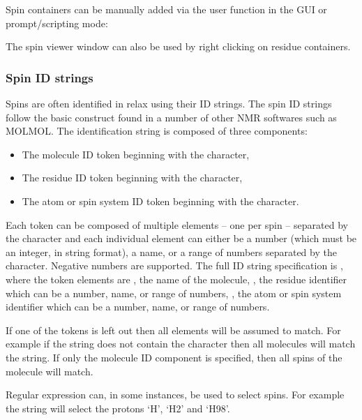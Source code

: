 Spin containers can be manually added via the  user function in the GUI or prompt/scripting mode:


The spin viewer window can also be used by right clicking on residue containers.



\subsubsection{Spin ID strings} \label{sect: spin ID}

Spins are often identified in relax using their ID strings.  The spin ID strings follow the basic construct found in a number of other NMR softwares such as MOLMOL.  The identification string is composed of three components:

\begin{itemize}
\item The molecule ID token beginning with the \promptstring{\#} character,
\item The residue ID token beginning with the \promptstring{:} character,
\item The atom or spin system ID token beginning with the  character.
\end{itemize}

Each token can be composed of multiple elements -- one per spin -- separated by the \promptstring{,} character and each individual element can either be a number (which must be an integer, in string format), a name, or a range of numbers separated by the \promptstring{-} character.  Negative numbers are supported.  The full ID string specification is , where the token elements are , the name of the molecule, , the residue identifier which can be a number, name, or range of numbers, , the atom or spin system identifier which can be a number, name, or range of numbers.

If one of the tokens is left out then all elements will be assumed to match.  For example if the string does not contain the \promptstring{\#} character then all molecules will match the string.  If only the molecule ID component is specified, then all spins of the molecule will match.

Regular expression can, in some instances, be used to select spins.  For example the string  will select the protons `H', `H2' and `H98'.



